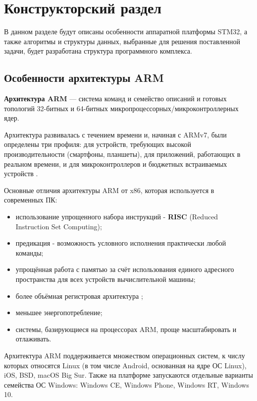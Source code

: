 \chapter{Конструкторский раздел}
\label{cha:design}

В данном разделе будут описаны особенности аппаратной платформы STM32, а также алгоритмы и структуры данных, выбранные для решения 
поставленной задачи, будет разработана структура программного комплекса.

\section{Особенности архитектуры ARM}

\textbf{Архитектура ARM} — система команд и семейство описаний и готовых топологий 32-битных и 64-битных микропроцессорных/микроконтроллерных ядер.

Архитектура развивалась с течением времени и, начиная с ARMv7, были определены три профиля: для устройств, требующих высокой производительности (смартфоны, планшеты), для приложений, работающих в реальном времени, и для микроконтроллеров и бюджетных встраиваемых устройств \cite{ARM_dev_doc}.

Основные отличия архитектуры ARM от x86, которая используется в современных ПК: \cite{ARM_vs_x86} %
\begin{itemize}
	\item использование упрощенного набора инструкций - \textbf{RISC} (Reduced Instruction Set Computing);
	\item предикация - возможность условного исполнения практически любой команды;
	\item упрощённая работа с памятью за счёт использования единого адресного пространства для всех устройств вычислительной машины;
	\item более объёмная регистровая архитектура \cite{ARM_registers} \cite{x86_registers};
	\item меньшее энергопотребление;
	\item системы, базирующиеся на процессорах ARM, проще масштабировать и отлаживать.
\end{itemize}

Архитектура ARM поддерживается множеством операционных систем, к числу которых относятся Linux (в том числе Android, основанная на ядре ОС Linux), iOS, BSD, macOS Big Sur. Также на платформе запускаются отдельные варианты семейства ОС Windows: Windows CE, Windows Phone, Windows RT, Windows 10.

